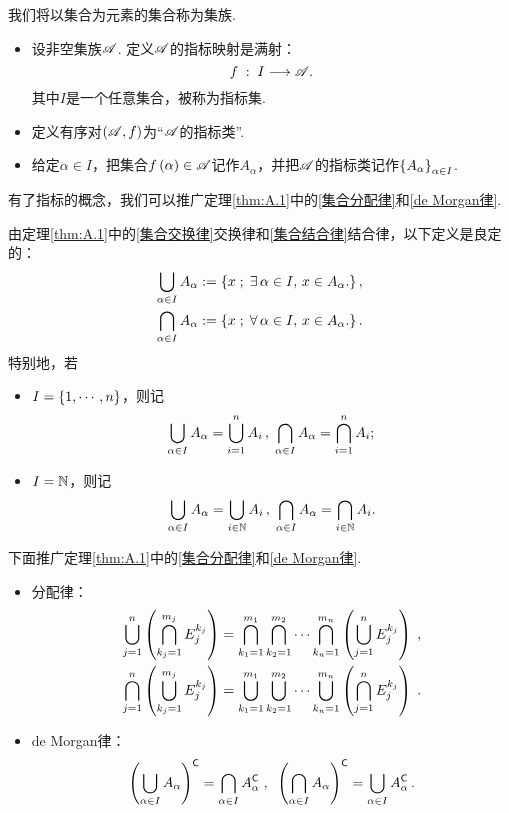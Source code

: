 我们将以集合为元素的集合称为集族.
\begin{definition}[指标映射]
    \begin{itemize}
        \item 设非空集族$\mathscr{A}$. 定义$\mathscr{A}$的指标映射是满射：
        \[  f\;:\;I\longrightarrow\mathscr{A}.  \] 其中$I$是一个任意集合，被称为指标集.
        \item 定义有序对$\left( \mathscr{A},f \right)$为“$\mathscr{A}$的指标类”.
        \item 给定$\alpha\in I$，把集合$f\left(\alpha\right)\in\mathscr{A}$记作$A_\alpha$，并把$\mathscr{A}$的指标类记作$\left\{ A_\alpha\right \}_{\alpha\in I}$.
    \end{itemize}
\end{definition}
有了指标的概念，我们可以推广定理\ref{thm:A.1}中的\ref{集合分配律}和\ref{de Morgan律}.
\begin{definition}[集合的任意交、并]
    由定理\ref{thm:A.1}中的\ref{集合交换律}交换律和\ref{集合结合律}结合律，以下定义是良定的：
    \begin{align*}
        \bigcup_{\alpha\in I} A_\alpha &:= \left\{     x\;;\;\exists\,\alpha\in I,\,x\in A_\alpha.   \right\}, \\
        \bigcap_{\alpha\in I} A_\alpha &:= \left\{     x\;;\;\forall\,\alpha\in I,\,x\in A_\alpha.   \right\}.
    \end{align*}
    特别地，若
    \begin{itemize}
        \item $I=\left\{ 1,\cdots,n  \right\}$，则记
        \[  \bigcup_{\alpha\in I} A_\alpha=\bigcup_{i=1}^n A_i\,,\; \bigcap_{\alpha\in I} A_\alpha=\bigcap_{i=1}^n A_i;  \]
        \item $I=\mathbb{N}$，则记
        \[  \bigcup_{\alpha\in I} A_\alpha=\bigcup_{i\in\mathbb{N}} A_i\,,\; \bigcap_{\alpha\in I} A_\alpha=\bigcap_{i\in\mathbb{N}} A_i.  \]
    \end{itemize}
\end{definition}
下面推广定理\ref{thm:A.1}中的\ref{集合分配律}和\ref{de Morgan律}.
\begin{theorem}\label{分配律和de Morgan律推广}
    \begin{itemize}
        \item 分配律：\begin{align*}
            \bigcup_{j=1}^n \left(  \bigcap_{k_j=1}^{m_j}  E_j^{k_j}  \right) &= \bigcap_{k_1=1}^{m_1} \bigcap_{k_2=1}^{m_2} \cdots \bigcap_{k_n=1}^{m_n} \left( \bigcup_{j=1}^n  E_j^{k_j} \right)\;,\\
            \bigcap_{j=1}^n \left(  \bigcup_{k_j=1}^{m_j}  E_j^{k_j}  \right) &= \bigcup_{k_1=1}^{m_1} \bigcup_{k_2=1}^{m_2} \cdots \bigcup_{k_n=1}^{m_n} \left( \bigcap_{j=1}^n  E_j^{k_j} \right)\;.
        \end{align*}
        \item de Morgan律：\[ \left(  \bigcup_{\alpha\in I} A_\alpha  \right)^{\mathsf{C}}=\bigcap_{\alpha\in I} A_\alpha^{\mathsf{C}} \;,\;\; \left(  \bigcap_{\alpha\in I} A_\alpha  \right)^{\mathsf{C}}=\bigcup_{\alpha\in I} A_\alpha^{\mathsf{C}} \,.\]
    \end{itemize}
\end{theorem}
\vspace{1cm}

